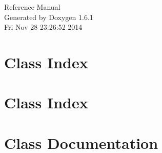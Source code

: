 \documentclass[a4paper]{book}
\begin{document}
\hypersetup{pageanchor=false}
\begin{titlepage}
\vspace*{7cm}
\begin{center}
{\Large Reference Manual}\\
\vspace*{1cm}
{\large Generated by Doxygen 1.6.1}\\
\vspace*{0.5cm}
{\small Fri Nov 28 23:26:52 2014}\\
\end{center}
\end{titlepage}
\clearemptydoublepage
{}
\tableofcontents
\clearemptydoublepage
{}
\hypersetup{pageanchor=true}
\chapter{Class Index}

\chapter{Class Index}

\chapter{Class Documentation}



























\printindex
\end{document}
